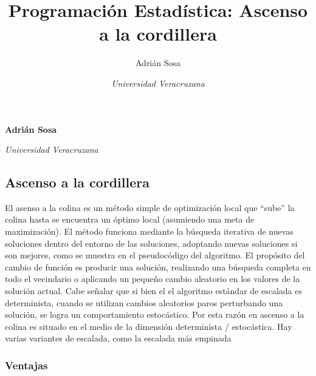 \documentclass[11pt,]{article}
\title{Programación Estadística: Ascenso a la cordillera  }
\author{\Large Adrián Sosa\vspace{0.05in} \newline\normalsize\emph{}   \and \Large \vspace{0.05in} \newline\normalsize\emph{Universidad Veracruzana}  }
\date{}
\newcommand*{\authorfont}{\fontfamily{phv}\selectfont}
\begin{document}
	
%

{%
\setlength{\parindent}{0pt}
\thispagestyle{plain}
{\fontsize{18}{20}\selectfont\raggedright 
\maketitle  %

}

{
   \vskip 13.5pt\relax \normalsize\fontsize{11}{12} 
\textbf{\authorfont Adrián Sosa} \hskip 15pt \emph{\small }   \par \textbf{\authorfont } \hskip 15pt \emph{\small Universidad Veracruzana}   
}

}






\vskip -8.5pt



\noindent  

\hypertarget{ascenso-a-la-cordillera}{%
\subsection{Ascenso a la cordillera}\label{ascenso-a-la-cordillera}}

El asenso a la colina es un método simple de optimización local que
``sube'' la colina hasta se encuentra un óptimo local (asumiendo una
meta de maximización). El método funciona mediante la búsqueda iterativa
de nuevas soluciones dentro del entorno de las soluciones, adoptando
nuevas soluciones si son mejores, como se muestra en el pseudocódigo del
algoritmo. El propósito del cambio de función es producir una solución,
realizando una búsqueda completa en todo el vecindario o aplicando un
pequeño cambio aleatorio en los valores de la solución actual. Cabe
señalar que si bien el el algoritmo estándar de escalada es
determinista, cuando se utilizan cambios aleatorios paros perturbando
una solución, se logra un comportamiento estocástico. Por esta razón en
ascenso a la colina es situado en el medio de la dimensión determinista
/ estocástica. Hay varias variantes de escalada, como la escalada más
empinada

\hypertarget{ventajas}{%
\subsubsection{Ventajas}\label{ventajas}}
\end{document}
